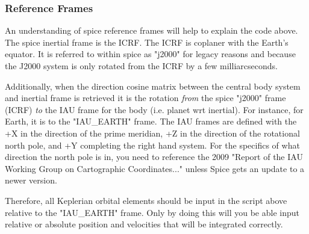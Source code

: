 \subsubsection{Reference Frames}
An understanding of spice reference frames will help to explain the code above. The spice inertial frame is the ICRF. The ICRF is coplaner with the Earth's equator. It is referred to within spice as "j2000" for legacy reasons and because the J2000 system is only rotated from the ICRF by a few milliarcseconds.

Additionally, when the direction cosine matrix between the central body system and inertial frame is retrieved it is the rotation \textit{from} the spice "j2000" frame (ICRF) \textit{to} the IAU frame for the body (i.e. planet wrt inertial). For instance, for Earth, it is to the "IAU\_EARTH" frame. The IAU frames are defined with the +X in the direction of the prime meridian, +Z in the direction of the rotational north pole, and +Y completing the right hand system. For the specifics of what direction the north pole is in, you need to reference the 2009 "Report of the IAU Working Group on Cartographic Coordinates..." unless Spice gets an update to a newer version.

Therefore, all Keplerian orbital elements should be input in the script above relative to the "IAU\_EARTH" frame. Only by doing this will you be able input relative or absolute position and velocities that will be integrated correctly.

